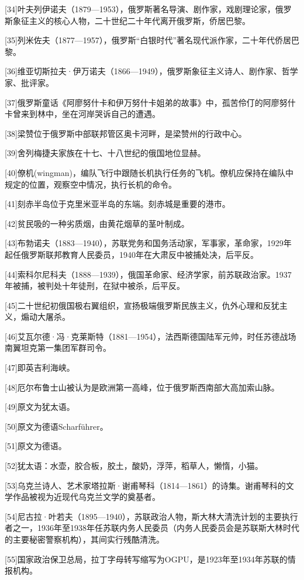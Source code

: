 [34]叶夫列伊诺夫（1879—1953），俄罗斯著名导演、剧作家，戏剧理论家，俄罗斯象征主义的核心人物，二十世纪二十年代离开俄罗斯，侨居巴黎。

[35]列米佐夫（1877—1957），俄罗斯“白银时代”著名现代派作家，二十年代侨居巴黎。

[36]维亚切斯拉夫·伊万诺夫（1866—1949），俄罗斯象征主义诗人、剧作家、哲学家、批评家。

[37]俄罗斯童话《阿廖努什卡和伊万努什卡姐弟的故事》中，孤苦伶仃的阿廖努什卡曾来到林中，坐在河岸哭诉自己的遭遇。

[38]梁赞位于俄罗斯中部联邦管区奥卡河畔，是梁赞州的行政中心。

[39]舍列梅捷夫家族在十七、十八世纪的俄国地位显赫。

[40]僚机(wingman)，编队飞行中跟随长机执行任务的飞机。僚机应保持在编队中规定的位置，观察空中情况，执行长机的命令。

[41]刻赤半岛位于克里米亚半岛的东端。刻赤城是重要的港市。

[42]贫民吸的一种劣质烟，由黄花烟草的茎叶制成。

[43]布勃诺夫（1883—1940），苏联党务和国务活动家，军事家，革命家，1929年起任俄罗斯联邦教育人民委员，1940年在大肃反中被捕处决，后平反。

[44]索科尔尼科夫（1888—1939），俄国革命家、经济学家，前苏联政治家。1937年被捕，被判处十年徒刑，在狱中被杀，后平反。

[45]二十世纪初俄国极右翼组织，宣扬极端俄罗斯民族主义，仇外心理和反犹主义，煽动大屠杀。

[46]艾瓦尔德·冯·克莱斯特（1881—1954），法西斯德国陆军元帅，时任苏德战场南翼坦克第一集团军群司令。

[47]即英吉利海峡。

[48]厄尔布鲁士山被认为是欧洲第一高峰，位于俄罗斯西南部大高加索山脉。

[49]原文为犹太语。

[50]原文为德语Scharführer。

[51]原文为德语。

[52]犹太语：水壶，胶合板，胶土，酸奶，浮萍，稻草人，懒惰，小猫。

[53]乌克兰诗人、艺术家塔拉斯·谢甫琴科（1814—1861）的诗集。谢甫琴科的文学作品被视为近现代乌克兰文学的奠基者。

[54]尼古拉·叶若夫（1895—1940），苏联政治人物，斯大林大清洗计划的主要执行者之一，1936年至1938年任苏联内务人民委员（内务人民委员会是苏联斯大林时代的主要秘密警察机构），其间实行残酷清洗。

[55]国家政治保卫总局，拉丁字母转写缩写为OGPU，是1923年至1934年苏联的情报机构。

